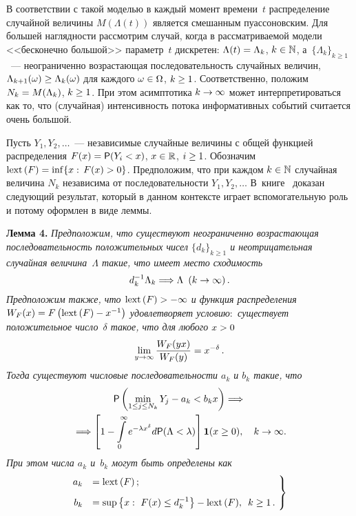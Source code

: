\begin{multicols}{2}
В соответствии с такой моделью в каждый момент времени~$t$
распределение случайной величины $M(\Lambda(t))$ является смешанным
пуассоновским. Для большей наглядности рассмотрим случай, когда в
рассматриваемой модели <<бесконечно большой>> параметр~$t$
дискретен: $\Lambda(t)\hm=\Lambda_k$,  $k\hm\in\mathbb{N}$,
а~$\{\Lambda_k\}_{k\ge1}$~--- неограниченно возрастающая
последовательность случайных величин,
$\Lambda_{k+1}(\omega)\hm\ge\Lambda_k(\omega)$ для каждого
$\omega\hm\in\Omega$, $k\hm\ge1$. Соответственно, положим
$N_k\hm=M(\Lambda_k)$, $k\hm\ge1$. При этом асимптотика $k\hm\to\infty$ может
интерпретироваться как то, что (случайная) интенсивность потока
информативных событий считается очень большой.

Пусть $Y_1,Y_2,\ldots$~--- независимые случайные величины с общей
функцией распределения $F(x)\hm={\sf P}(Y_i<x)$, $x\hm\in\mathbb{R}$,
$i\hm\ge1$. Обозначим $\mathrm{lext}\left(F\right)\hm=\inf\{x:\,F(x)>0\}$.
Предположим, что при \mbox{каж\-дом} $k\hm\in\mathbb{N}$ случайная величина
$N_k$ независима от последовательности $Y_1,Y_2,\ldots$
В~книге~\cite{KorolevSokolov2008} доказан следующий результат, который в
данном контексте играет вспомогательную роль и потому оформлен в
виде леммы.

\bigskip

\noindent
\textbf{Лемма 4.} \textit{Предположим, что существуют неограниченно
возрастающая после\-до\-ва\-тель\-ность положительных чисел
$\{d_k\}_{k\ge1}$ и неотрицательная случайная величина~$\Lambda$
такие, что имеет место сходимость}
$$
d_k^{-1}\Lambda_k\Longrightarrow \Lambda\enskip (k\to\infty)\,.
$$
\textit{Предположим также, что $\mathrm{lext}\left(F\right)\hm>-\infty$ и функция
распределения $W_F(x)\hm=F\left( \mathrm{lext}\,(F)-x^{-1}\right)$
удовлетворяет условию$:$ существует положительное число~$\delta$
такое, что для любого $x\hm>0$}
\begin{equation}
\lim\limits_{y\to\-\infty}\displaystyle\frac{\displaystyle W_F(yx)\mathstrut}{\displaystyle W_F(y)\mathstrut}=x^{-\delta}\,.\label{e11-kor}
\end{equation}
\textit{Тогда существуют числовые последовательности $a_k$ и $b_k$ такие,
что}
\begin{multline*}
{\sf P}\left(\min_{1\le j\le N_k}Y_j-a_k<b_kx\right) \Longrightarrow{}\\
{}\Longrightarrow \left[
 1-\int\limits_{0}^{\infty}e^{-\lambda x^{\delta}}d{\sf P}
(\Lambda<\lambda)\right]\mathbf{1}(x\ge 0),\  \ \ k\to\infty.
\end{multline*}
\textit{При этом числа $a_k$ и~$b_k$ могут быть определены как}
\begin{equation}
\hspace*{-3mm}\left.
\begin{array}{rl}
a_k&=\mathrm{lext}\,(F)\,;\\[9pt]
b_k&=\sup\left\{x:\ F(x)\le
d_k^{-1}\right\}-\mathrm{lext}\,(F),\enskip k\ge1\,.
\end{array}\!
\right\}\!\!
\label{e12-kor}
\end{equation}


\end{multicols}
